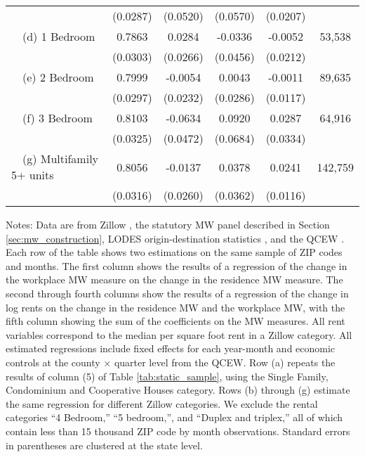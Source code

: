 \begin{landscape}
\begin{table}[ht!]
\begin{tabular}{@{}lccccc@{}}
                                                 & (0.0287) & (0.0520) & (0.0570) & (0.0207) &      \\
        $\quad$(d) 1 Bedroom                     &  0.7863  &  0.0284  &  -0.0336  &  -0.0052  & 53,538 \\
                                                 & (0.0303) & (0.0266) & (0.0456) & (0.0212) &      \\
        $\quad$(e) 2 Bedroom                     &  0.7999  &  -0.0054  &  0.0043  &  -0.0011  & 89,635 \\
                                                 & (0.0297) & (0.0232) & (0.0286) & (0.0117) &      \\
        $\quad$(f) 3 Bedroom                     &  0.8103  &  -0.0634  &  0.0920  &  0.0287  & 64,916 \\
                                                 & (0.0325) & (0.0472) & (0.0684) & (0.0334) &      \\
        $\quad$(g) Multifamily 5+ units          &  0.8056  &  -0.0137  &  0.0378  &  0.0241  & 142,759 \\
                                                 & (0.0316) & (0.0260) & (0.0362) & (0.0116) &      \\ \bottomrule
    \end{tabular}

    \begin{minipage}{.95\linewidth} \footnotesize
        \vspace{2mm}
        Notes:
        Data are from Zillow \parencite{ZillowData}, 
        the statutory MW panel described in Section \ref{sec:mw_construction}, 
        LODES origin-destination statistics \parencite{CensusLODES},
        and the QCEW \parencite{QCEW}.
        Each row of the table shows two estimations on the same sample of ZIP 
        codes and months.
        The first column shows the results of a regression of the change in the 
        workplace MW measure on the change in the residence MW measure.
        The second through fourth columns show the results of a regression of 
        the change in log rents on the change in the residence MW and the 
        workplace MW, with the fifth column showing the sum of the coefficients 
        on the MW measures.
        All rent variables correspond to the median per square foot rent in a 
        Zillow category.
        All estimated regressions include fixed effects for each year-month and 
        economic controls at the county $\times$ quarter level from the QCEW.
        Row (a) repeats the results of column (5) of Table \ref{tab:static_sample}, 
        using the Single Family, Condominium and Cooperative Houses category.
        Rows (b) through (g) estimate the same regression for different Zillow 
        categories.
        We exclude the rental categories ``4 Bedroom,'' ``5 bedroom,'', and 
        ``Duplex and triplex,'' all of which contain less than 15 thousand
        ZIP code by month observations.
        Standard errors in parentheses are clustered at the state level.
    \end{minipage}
\end{table}
\end{landscape}
